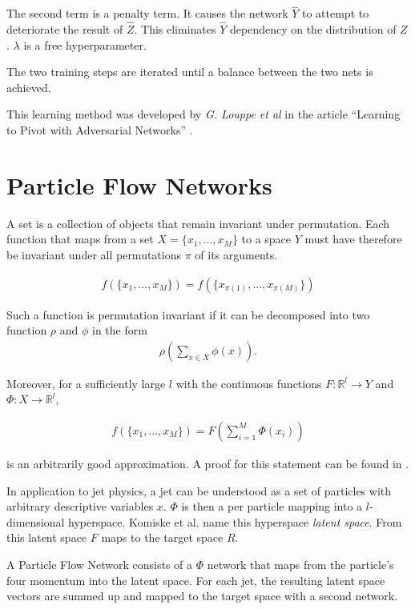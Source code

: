\documentclass[12pt, a4paper]{thesis}
\begin{document}
The second term is a penalty term. It causes the network \(\hat Y\) to
attempt to deteriorate the result of \(\hat Z\). This eliminates
\(\hat Y\) dependency on the distribution of \(Z\). \(\lambda\) is a
free hyperparameter.

The two training steps are iterated until a balance between the two nets is achieved.

This learning method was developed by \emph{G. Louppe et al} in the
article ``Learning to Pivot with Adversarial Networks'' \cite{louppe16_learn_to_pivot}.

\section{Particle Flow Networks}
\label{sec:orgde973b7}

A set is a collection of objects that remain invariant under permutation. Each function that maps from a set \(X = \{x_1, ... , x_M \}\) to a space \(Y\) must have
therefore be invariant under all permutations $\pi$ of its arguments.

\begin{align}
f(\{x_1, ... , x_M \}) = f(\{x_{\pi(1)}, ... , x_{\pi(M)}\})
\end{align}

Such a function is permutation invariant if it can be decomposed into
two function $\rho$ and $\phi$ in the form
\begin{align}
\rho \left(\sum_{x\in X} \phi(x)\right).  
\end{align}

Moreover, for a sufficiently large \(l\) with the continuous functions
\(F: \mathbb{R}^l \rightarrow Y\) and \(\Phi: X \rightarrow
\mathbb{R}^l\),

\begin{align}
f(\{x_1, ... , x_M \}) = F(\sum_{i=1}^M \Phi(x_i))
\end{align}

is an arbitrarily good approximation. A proof for this statement can be
found in \cite{zaheer17_deep_sets}.

In application to jet physics, a jet can be understood as a set of
particles with arbitrary descriptive variables \(x\). \(\Phi\) is then
a per particle mapping into a \(l\)-dimensional hyperspace.  Komiske
et al. name this hyperspace \emph{latent space}. From this latent
space \(F\) maps to the target space \(R\).

A Particle Flow Network \cite{komiske19_energ_flow_networ} consists of
a \(\Phi\) network that maps from the particle's four momentum into
the latent space. For each jet, the resulting latent space vectors are
summed up and mapped to the target space with a second network.
\end{document}
